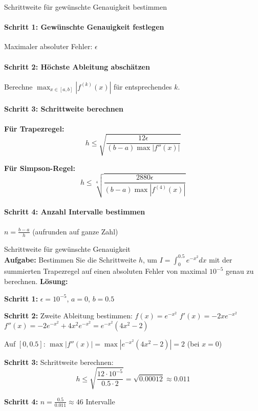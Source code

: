 \begin{KR}{Schrittweite für gewünschte Genauigkeit bestimmen}
\paragraph{Schritt 1: Gewünschte Genauigkeit festlegen}
Maximaler absoluter Fehler: $\epsilon$

\paragraph{Schritt 2: Höchste Ableitung abschätzen}
Berechne $\max_{x \in [a,b]} |f^{(k)}(x)|$ für entsprechendes $k$.

\paragraph{Schritt 3: Schrittweite berechnen}
\textbf{Für Trapezregel:} $$h \leq \sqrt{\frac{12\epsilon}{(b-a) \max |f''(x)|}}$$

\textbf{Für Simpson-Regel:} $$h \leq \sqrt[4]{\frac{2880\epsilon}{(b-a) \max |f^{(4)}(x)|}}$$

\paragraph{Schritt 4: Anzahl Intervalle bestimmen}
$n = \frac{b-a}{h}$ (aufrunden auf ganze Zahl)
\end{KR}

\begin{example2}{Schrittweite für gewünschte Genauigkeit}\\
\textbf{Aufgabe:} Bestimmen Sie die Schrittweite $h$, um $I = \int_0^{0.5} e^{-x^2} dx$ mit der summierten Trapezregel auf einen absoluten Fehler von maximal $10^{-5}$ genau zu berechnen.
\tcblower
\textbf{Lösung:}

\textbf{Schritt 1:} $\epsilon = 10^{-5}$, $a = 0$, $b = 0.5$

\textbf{Schritt 2:} Zweite Ableitung bestimmen:
$f(x) = e^{-x^2}$
$f'(x) = -2xe^{-x^2}$
$f''(x) = -2e^{-x^2} + 4x^2e^{-x^2} = e^{-x^2}(4x^2 - 2)$

Auf $[0, 0.5]$: $\max |f''(x)| = \max |e^{-x^2}(4x^2 - 2)| = 2$ (bei $x = 0$)

\textbf{Schritt 3:} Schrittweite berechnen:
$$h \leq \sqrt{\frac{12 \cdot 10^{-5}}{0.5 \cdot 2}} = \sqrt{0.00012} \approx 0.011$$

\textbf{Schritt 4:} $n = \frac{0.5}{0.011} \approx 46$ Intervalle
\end{example2}

